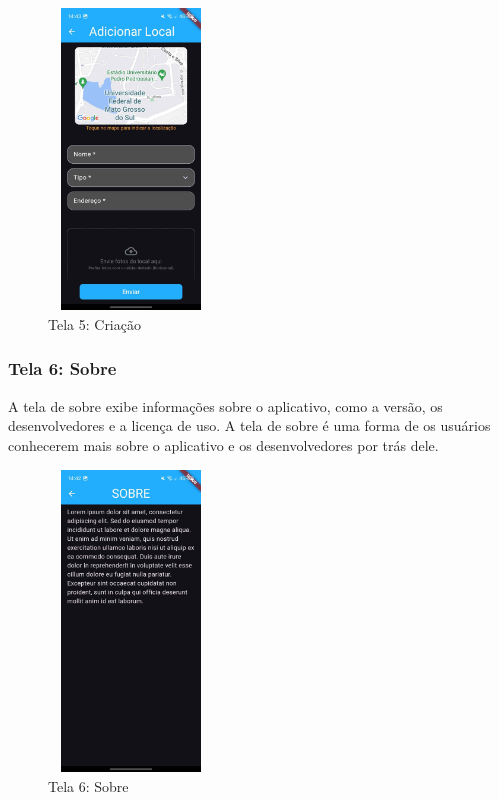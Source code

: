     \begin{figure}[h]
        \centering
        \includegraphics[width=44mm,height=80mm]{imagens/criacao.jpg}
        \caption{\scriptsize Tela 5: Criação}
        \footnotesize  {}
        \label{fig:tela5}
    \end{figure}

    \FloatBarrier

\subsubsection{Tela 6: Sobre}

    A tela de sobre exibe informações sobre o aplicativo, como a versão, os desenvolvedores e a licença de uso. A tela de sobre é uma forma de os usuários conhecerem mais sobre o aplicativo e os desenvolvedores por trás dele.

    \begin{figure}[h]
        \centering
        \includegraphics[width=44mm,height=80mm]{imagens/sobre.jpg}
        \caption{\scriptsize Tela 6: Sobre}
        \footnotesize  {}
        \label{fig:tela6}
    \end{figure}

